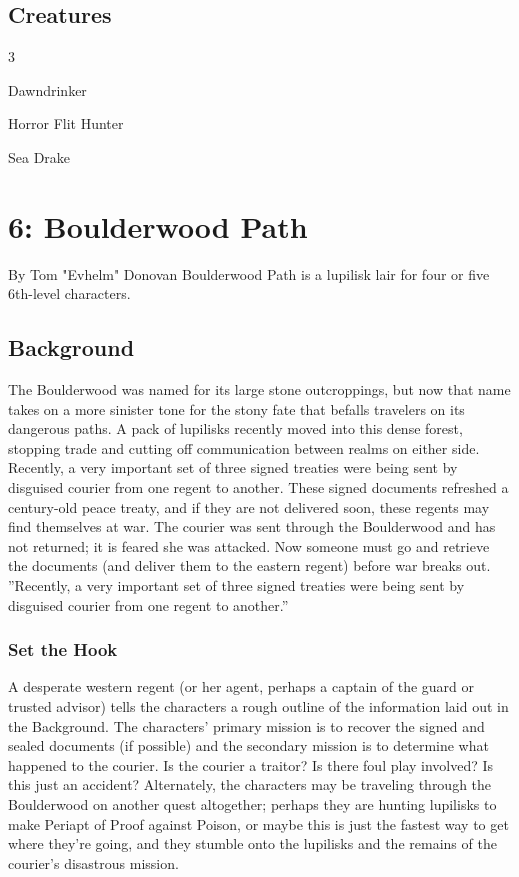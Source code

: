 \documentclass[10pt,a4paper,twoside,twocolumn,openany,bg=print,nodeprecatedcode]{dndbook}
\begin{document}
\section{Creatures}

\begin{itemize}
\begin{multicols}{3}
\item Dawndrinker
\item Horror Flit Hunter
\item Sea Drake
\end{multicols}

\end{itemize}

\chapter{6: Boulderwood Path}
By Tom "Evhelm" Donovan
Boulderwood Path is a lupilisk lair for four or five 6th-level characters.
\section{Background}
The Boulderwood was named for its large stone outcroppings, but now that name takes on a more sinister tone for the stony fate that befalls travelers on its dangerous paths. A pack of lupilisks recently moved into this dense forest, stopping trade and cutting off communication between realms on either side.
Recently, a very important set of three signed treaties were being sent by disguised courier from one regent to another. These signed documents refreshed a century-old peace treaty, and if they are not delivered soon, these regents may find themselves at war.
The courier was sent through the Boulderwood and has not returned; it is feared she was attacked. Now someone must go and retrieve the documents (and deliver them to the eastern regent) before war breaks out.
\DndQuote%
{}
{''Recently, a very important set of three signed treaties were being sent by disguised courier from one regent to another.''}
{}
\subsection{Set the Hook}
A desperate western regent (or her agent, perhaps a captain of the guard or trusted advisor) tells the characters a rough outline of the information laid out in the Background. The characters' primary mission is to recover the signed and sealed documents (if possible) and the secondary mission is to determine what happened to the courier. Is the courier a traitor? Is there foul play involved? Is this just an accident?
Alternately, the characters may be traveling through the Boulderwood on another quest altogether; perhaps they are hunting lupilisks to make Periapt of Proof against Poison, or maybe this is just the fastest way to get where they're going, and they stumble onto the lupilisks and the remains of the courier's disastrous mission.
\end{document}
